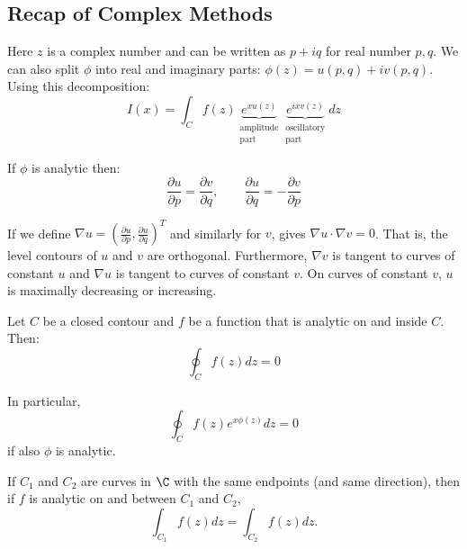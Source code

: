 \documentclass[../Main.tex]{subfiles}
\begin{document}
\subsection{Recap of Complex Methods}
Here $z$ is a complex number and can be written as $p + iq$ for real number $p, q$. We can also split $\phi$ into real and imaginary parts: $\phi(z) = u(p, q) + iv(p, q)$. Using this decomposition:
\begin{equation*}
    I(x) = \int_C f(z) \underbrace{e^{xu(z)}}_{\substack{\text{amplitude}\\\text{part}}} \underbrace{e^{ixv(z)}}_{\substack{\text{oscillatory}\\\text{part}}} dz
\end{equation*}
\begin{proposition}
    If $\phi$ is analytic then:
    \begin{equation*}
        \frac{\partial u}{\partial p} = \frac{\partial v}{\partial q}, \qquad \frac{\partial u}{\partial q} = -\frac{\partial v}{\partial p}
    \end{equation*}
    \label{propCauchyRiemann}
\end{proposition}
If we define $\nabla u = \left(\frac{\partial u}{\partial p}, \frac{\partial u}{\partial q}\right)^T$ and similarly for $v$,  gives $\nabla u \cdot \nabla v = 0$. That is, the level contours of $u$ and $v$ are orthogonal. Furthermore, $\nabla v$ is tangent to curves of constant $u$ and $\nabla u$ is tangent to curves of constant $v$. On curves of constant $v$, $u$ is maximally decreasing or increasing.
\begin{theorem}
    Let $C$ be a closed contour and $f$ be a function that is analytic on and inside $C$. Then:
    \begin{equation}
        \oint_C f(z) dz = 0
        \label{eqnClosedIntZero}
    \end{equation}
    \label{thmCauchy}
\end{theorem}
\begin{remark}
    In particular,
    \begin{equation*}
        \oint_C f(z) e^{x\phi(z)} dz = 0
    \end{equation*}
    if also $\phi$ is analytic.
\end{remark}
\begin{corollary}
    If $C_1$ and $C_2$ are curves in $\C$ with the same endpoints (and same direction), then if $f$ is analytic on and between $C_1$ and $C_2$,
    \begin{equation*}
        \int_{C_1} f(z) dz = \int_{C_2} f(z) dz.
    \end{equation*}
    \label{corSameInt}
\end{corollary}
\end{document}
